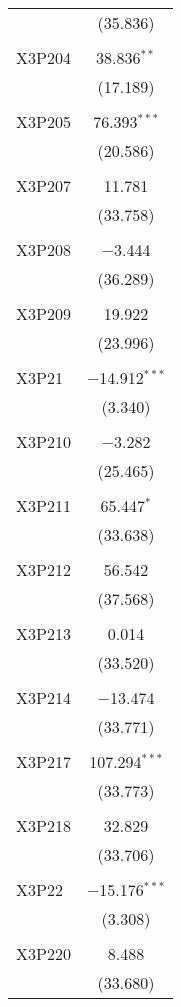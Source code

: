 \begin{table}[!htbp]
\begin{tabular}{@{\extracolsep{5pt}}lc}
  & (35.836) \\ 
  & \\ 
 X3P204 & 38.836$^{**}$ \\ 
  & (17.189) \\ 
  & \\ 
 X3P205 & 76.393$^{***}$ \\ 
  & (20.586) \\ 
  & \\ 
 X3P207 & 11.781 \\ 
  & (33.758) \\ 
  & \\ 
 X3P208 & $-$3.444 \\ 
  & (36.289) \\ 
  & \\ 
 X3P209 & 19.922 \\ 
  & (23.996) \\ 
  & \\ 
 X3P21 & $-$14.912$^{***}$ \\ 
  & (3.340) \\ 
  & \\ 
 X3P210 & $-$3.282 \\ 
  & (25.465) \\ 
  & \\ 
 X3P211 & 65.447$^{*}$ \\ 
  & (33.638) \\ 
  & \\ 
 X3P212 & 56.542 \\ 
  & (37.568) \\ 
  & \\ 
 X3P213 & 0.014 \\ 
  & (33.520) \\ 
  & \\ 
 X3P214 & $-$13.474 \\ 
  & (33.771) \\ 
  & \\ 
 X3P217 & 107.294$^{***}$ \\ 
  & (33.773) \\ 
  & \\ 
 X3P218 & 32.829 \\ 
  & (33.706) \\ 
  & \\ 
 X3P22 & $-$15.176$^{***}$ \\ 
  & (3.308) \\ 
  & \\ 
 X3P220 & 8.488 \\ 
  & (33.680) \\ 

\end{tabular}
\end{table}
